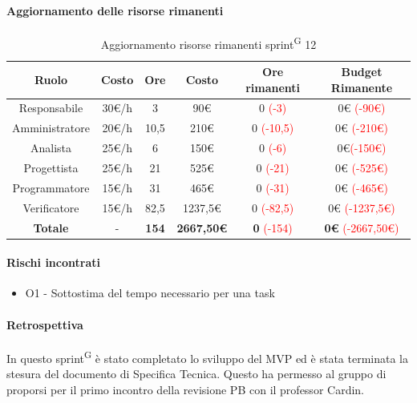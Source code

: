\documentclass[a4paper, 11pt]{article}
\newcommand{\subsubsubsection}[1]{\paragraph{#1}}
\renewcommand{\arraystretch}{1.4} %
\begin{document}
\subsubsubsection{Aggiornamento delle risorse rimanenti}
\begin{table}[H]
	\centering
	\renewcommand{\arraystretch}{1.5}
	
	\begin{tabular}{|c|c|c|c|c|c|}
		\hline
		\textcolor{AccentColor}{\textbf{Ruolo}} &
		\textcolor{AccentColor}{\textbf{Costo}} &
		\textcolor{AccentColor}{\textbf{Ore}} &
		\textcolor{AccentColor}{\textbf{Costo}} &
		\textcolor{AccentColor}{\textbf{Ore rimanenti}} &
		\textcolor{AccentColor}{\textbf{Budget Rimanente}} \\ \hline
		
		Responsabile & 30€/h & 3 & 90€ & 0 \textcolor{red}{(-3)} & 0€ \textcolor{red}{(-90€)}\\ \hline
		
		Amministratore & 20€/h & 10,5 & 210€ & 0 \textcolor{red}{(-10,5)}& 0€ \textcolor{red}{(-210€)} \\ \hline
		
		Analista & 25€/h & 6 & 150€ & 0 \textcolor{red}{(-6)}& 0€\textcolor{red}{(-150€)} \\ \hline
		
		Progettista & 25€/h & 21 & 525€ & 0 \textcolor{red}{(-21)} & 0€ \textcolor{red}{(-525€)}\\ \hline
		
		Programmatore & 15€/h & 31 & 465€ & 0 \textcolor{red}{(-31)} & 0€ \textcolor{red}{(-465€)} \\ \hline
		
		Verificatore & 15€/h & 82,5 & 1237,5€ & 0 \textcolor{red}{(-82,5)}& 0€ \textcolor{red}{(-1237,5€)} \\ \hline
		
		\textbf{Totale} & - & \textbf{154} & \textbf{2667,50€} & \textbf{0} \textcolor{red}{(-154)} & \textbf{0€} \textcolor{red}{(-2667,50€)}\\ \hline
	\end{tabular}
	\caption{Aggiornamento risorse rimanenti sprint\textsuperscript{G} 12}
\end{table}
\subsubsubsection{Rischi incontrati}
\begin{itemize}
	\item O1 - Sottostima del tempo necessario per una task
\end{itemize}
\subsubsubsection{Retrospettiva}
In questo sprint\textsuperscript{G} è stato completato lo sviluppo del MVP ed è stata terminata la stesura del documento di Specifica Tecnica. Questo ha permesso al gruppo di proporsi per il primo incontro della revisione PB con il professor Cardin.\\
\end{document}
